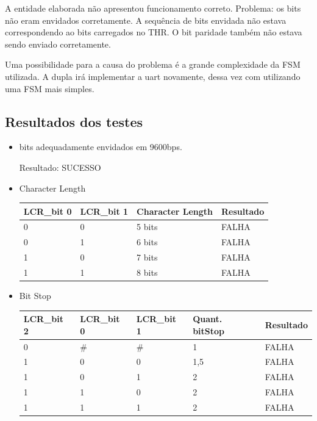 \documentclass[12pt, a4paper]{article}
\begin{document}
	A entidade elaborada não apresentou funcionamento correto. 
	Problema: os bits não eram envidados corretamente.
	A sequência de bits envidada não estava correspondendo ao bits carregados no THR.
	O bit paridade também não estava sendo enviado corretamente.
	\par
	Uma possibilidade para a causa do problema é a grande complexidade da FSM utilizada. 
	A dupla irá implementar a uart novamente, dessa vez com utilizando uma FSM mais simples.
	
	\subsection*{Resultados dos testes}

	\begin{itemize}
		\item bits adequadamente envidados em 9600bps.
		\par Resultado: SUCESSO
		
		\item Character Length
		\begin{table}[H]
			\begin{center}
				\begin{tabular}{|l|l|l|l|}
					\hline
					LCR\_bit 0 & LCR\_bit 1 & Character Length & Resultado \\ \hline
					0     & 0     & 5 bits           &      FALHA     \\ \hline
					0     & 1     & 6 bits           &    FALHA       \\ \hline
					1     & 0     & 7 bits           &FALHA           \\ \hline
					1     & 1     & 8 bits           &FALHA           \\ \hline
				\end{tabular}
			\end{center}
		\end{table}
		
		\item Bit Stop
		\begin{table}[H]
			\begin{center}
				\begin{tabular}{|l|l|l|l|l|}
					\hline
					LCR\_bit 2 & LCR\_bit 0 & LCR\_bit 1 & Quant. bitStop & Resultado \\ \hline
					0          & \#         & \#         & 1              & FALHA          \\ \hline
					1          & 0          & 0          & 1,5            & FALHA          \\ \hline
					1          & 0          & 1          & 2              & FALHA          \\ \hline
					1          & 1          & 0          & 2              & FALHA          \\ \hline
					1          & 1          & 1          & 2              & FALHA          \\ \hline
				\end{tabular}
			\end{center}
		\end{table}
		

\end{itemize}
\end{document}
